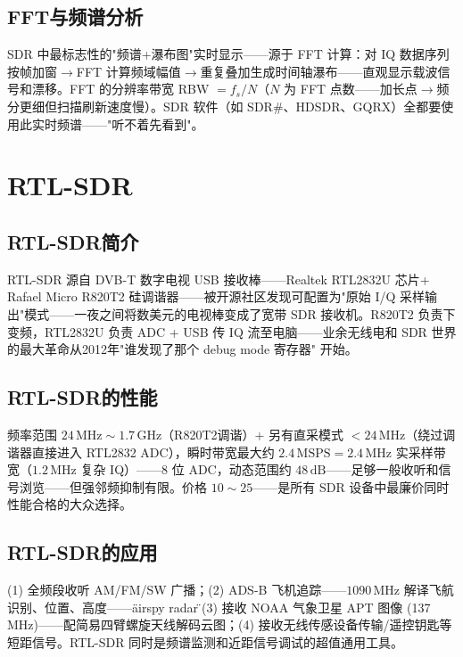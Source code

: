 \documentclass[12pt,UTF8]{ctexbook}
\begin{document}
\subsection{FFT与频谱分析}

SDR 中最标志性的"频谱+瀑布图"实时显示——源于 FFT 计算：对 IQ 数据序列按帧加窗$\rightarrow$FFT 计算频域幅值$\rightarrow$重复叠加生成时间轴瀑布——直观显示载波信号和漂移。FFT 的分辨率带宽 RBW $= f_s/N$（$N$ 为 FFT 点数——加长点$\rightarrow$频分更细但扫描刷新速度慢）。SDR 软件（如 SDR\#、HDSDR、GQRX）全都要使用此实时频谱——"听不着先看到"。

\section{RTL-SDR}
\label{sec:rtl_sdr}

\subsection{RTL-SDR简介}

RTL-SDR 源自 DVB-T 数字电视 USB 接收棒——Realtek RTL2832U 芯片+ Rafael Micro R820T2 硅调谐器——被开源社区发现可配置为"原始 I/Q 采样输出"模式——一夜之间将数美元的电视棒变成了宽带 SDR 接收机。R820T2 负责下变频，RTL2832U 负责 ADC + USB 传 IQ 流至电脑——业余无线电和 SDR 世界的最大革命从2012年"谁发现了那个 debug mode 寄存器" 开始。

\subsection{RTL-SDR的性能}

频率范围 $24\,\mathrm{MHz}\sim1.7\,\mathrm{GHz}$（R820T2调谐）+ 另有直采模式 $<24\,\mathrm{MHz}$（绕过调谐器直接进入 RTL2832 ADC），瞬时带宽最大约 $2.4\,\mathrm{MSPS}=2.4\,\mathrm{MHz}$ 实采样带宽（$1.2\,\mathrm{MHz}$ 复杂 IQ）——8 位 ADC，动态范围约 $48\,\mathrm{dB}$——足够一般收听和信号浏览——但强邻频抑制有限。价格 $10\sim25$——是所有 SDR 设备中最廉价同时性能合格的大众选择。

\subsection{RTL-SDR的应用}

(1) 全频段收听 AM/FM/SW 广播；(2) ADS-B 飞机追踪——$1090\,\mathrm{MHz}$ 解译飞航识别、位置、高度——\"airspy radar\"；(3) 接收 NOAA 气象卫星 APT 图像 (137 MHz)——配简易四臂螺旋天线解码云图；(4) 接收无线传感设备传输/遥控钥匙等短距信号。RTL-SDR 同时是频谱监测和近距信号调试的超值通用工具。
\end{document}
